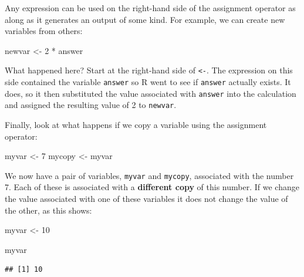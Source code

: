 \documentclass[
]{book}
\newenvironment{Shaded}{\begin{snugshade}}{\end{snugshade}}
\newcommand{\DecValTok}[1]{\textcolor[rgb]{0.00,0.00,0.81}{#1}}
\newcommand{\NormalTok}[1]{#1}
\newcommand{\OtherTok}[1]{\textcolor[rgb]{0.56,0.35,0.01}{#1}}
\newcommand{\SpecialCharTok}[1]{\textcolor[rgb]{0.00,0.00,0.00}{#1}}
\begin{document}
Any expression can be used on the right-hand side of the assignment operator as along as it generates an output of some kind. For example, we can create new variables from others:

\begin{Shaded}
\begin{Highlighting}[]
\NormalTok{newvar }\OtherTok{\textless{}{-}} \DecValTok{2} \SpecialCharTok{*}\NormalTok{ answer}
\end{Highlighting}
\end{Shaded}

What happened here? Start at the right-hand side of \texttt{\textless{}-}. The expression on this side contained the variable \texttt{answer} so R went to see if \texttt{answer} actually exists. It does, so it then substituted the value associated with \texttt{answer} into the calculation and assigned the resulting value of 2 to \texttt{newvar}.

Finally, look at what happens if we copy a variable using the assignment operator:

\begin{Shaded}
\begin{Highlighting}[]
\NormalTok{myvar }\OtherTok{\textless{}{-}} \DecValTok{7}
\NormalTok{mycopy }\OtherTok{\textless{}{-}}\NormalTok{ myvar}
\end{Highlighting}
\end{Shaded}

We now have a pair of variables, \texttt{myvar} and \texttt{mycopy}, associated with the number 7. Each of these is associated with a \textbf{different copy} of this number. If we change the value associated with one of these variables it does not change the value of the other, as this shows:

\begin{Shaded}
\begin{Highlighting}[]
\NormalTok{myvar }\OtherTok{\textless{}{-}} \DecValTok{10}
\end{Highlighting}
\end{Shaded}

\begin{Shaded}
\begin{Highlighting}[]
\NormalTok{myvar}
\end{Highlighting}
\end{Shaded}

\begin{verbatim}
## [1] 10
\end{verbatim}
\end{document}

